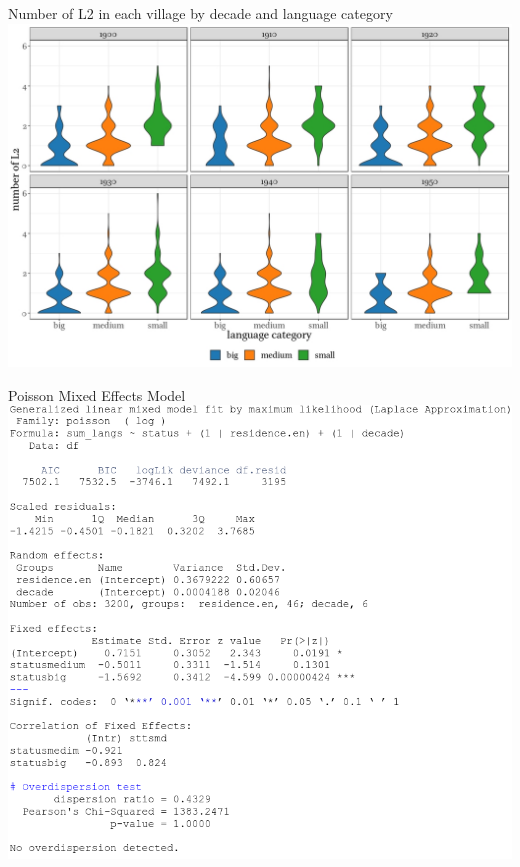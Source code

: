 \documentclass[13pt, t]{beamer}
\begin{document}



\begin{frame}{Number of L2 in each village by decade and language category}
\hspace{-0.9cm}\includegraphics[width=1.08\linewidth]{images/12_panel_1100_750}
\end{frame}

\begin{frame}{Poisson Mixed Effects Model}
\includegraphics[width=0.87\linewidth]{images/13_poisson}
\end{frame}
\end{document}
